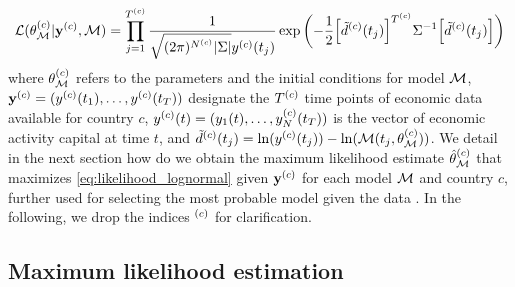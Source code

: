 \begin{equation}\label{eq:likelihood_lognormal}
  \mathcal{L}(\theta^{(c)}_{\mathcal{M}} | {\textbf{y}^{(c)} }, \mathcal{M}) = \prod_{j=1}^{T^{(c)}} \frac{1}{\sqrt{(2\pi)^{N^{(c)}}|\Sigma|} y^{(c)}(t_j)} \exp \left(-\frac{1}{2} \Big[ \tilde{d}^{(c)}(t_j)\Big]^{T^{(c)}} \Sigma^{-1} \Big[ \tilde{d}^{(c)}(t_j)\Big] \right)
\end{equation}
% 
where $\theta^{(c)}_{\mathcal{M}}$ refers to the parameters and the initial conditions for model $\mathcal{M}$, $\textbf{y}^{(c)} = (y^{(c)}(t_1), \allowbreak \dots, y^{(c)}(t_T))$  designate the $T^{(c)}$ time points of economic data available for country $c$, $ y^{(c)}(t) = (y_1(t), \dots, y^{(c)}_N(t_T))$ is the vector of economic activity capital at time $t$, and $\tilde{d}^{(c)}(t_j) = \ln(y^{(c)}(t_j)) - \ln(\mathcal{M}(t_j,\theta^{(c)}_{\mathcal{M}}))$. 
% 
We detail in the next section how do we obtain the maximum likelihood estimate $\hat\theta^{(c)}_{\mathcal{M}}$ that maximizes \cref{eq:likelihood_lognormal} given $\textbf{y}^{(c)}$ for each model $\mathcal{M}$ and country $c$, further used for selecting the most probable model given the data \citep{Burnham2002}. In the following, we drop the indices $^{(c)}$ for clarification.

\subsection{Maximum likelihood estimation}\label{parameter-inference}

